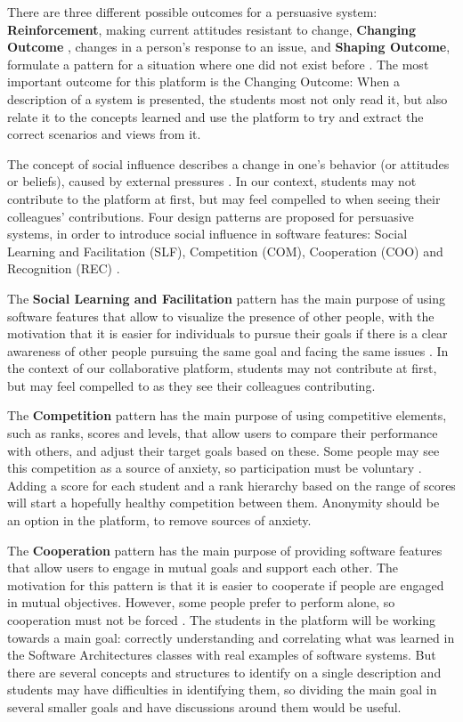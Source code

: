 \documentclass{llncs}
\begin{document}
There are three different possible outcomes for a persuasive system: \textbf{Reinforcement}, making current attitudes resistant to change, \textbf{Changing Outcome }, changes in a person's response to an issue, and \textbf{Shaping Outcome}, formulate a pattern for a situation where one did not exist before \cite{oinas2008towards}. The most important outcome for this platform is the Changing Outcome: When a description of a system is presented, the students most not only read it, but also relate it to the concepts learned and use the platform to try and extract the correct scenarios and views from it.

The concept of social influence describes a change in one's behavior (or attitudes or beliefs), caused by external pressures \cite{guadagno2010preference}. In our context, students may not contribute to the platform at first, but may feel compelled to when seeing their colleagues' contributions. Four design patterns are proposed for persuasive systems, in order to introduce social influence in software features: Social Learning and Facilitation (SLF), Competition (COM), Cooperation (COO) and Recognition (REC) \cite{oduor2014persuasive}. 

The \textbf{Social Learning and Facilitation} pattern has the main purpose of using software features that allow to visualize the presence of other people, with the motivation that it is easier for individuals to pursue their goals if there is a clear awareness of other people pursuing the same goal and facing the same issues \cite{oduor2014persuasive}. In the context of our collaborative platform, students may not contribute at first, but may feel compelled to as they see their colleagues contributing.

The \textbf{Competition} pattern has the main purpose of using competitive elements, such as ranks, scores and levels, that allow users to compare their performance with others, and adjust their target goals based on these. Some people may see this competition as a source of anxiety, so participation must be voluntary \cite{oduor2014persuasive}. Adding a score for each student and a rank hierarchy based on the range of scores will start a hopefully healthy competition between them. Anonymity should be an option in the platform, to remove sources of anxiety.

The \textbf{Cooperation} pattern has the main purpose of providing software features that allow users to engage in mutual goals and support each other. The motivation for this pattern is that it is easier to cooperate if people are engaged in mutual objectives. However, some people prefer to perform alone, so cooperation must not be forced \cite{oduor2014persuasive}. The students in the platform will be working towards a main goal: correctly understanding and correlating what was learned in the Software Architectures classes with real examples of software systems. But there are several concepts and structures to identify on a single description and students may have difficulties in identifying them, so dividing the main goal in several smaller goals and have discussions around them would be useful.
\end{document}
